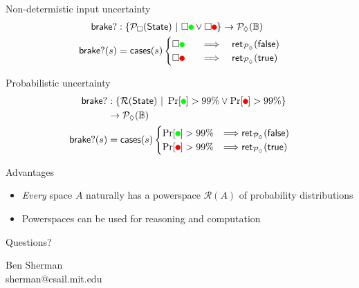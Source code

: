 \documentclass[14pt, notes]{beamer}
\newcommand{\PLower}{\mathcal{P}_\lozenge}
\newcommand{\PUpper}{\mathcal{P}_\square}
\newcommand{\Prob}{\mathcal{R}}
\newcommand{\State}{\mathsf{State}}
\newcommand{\suchthat}{\ |\ }
\newcommand{\bool}{\mathbb{B}}
\newcommand{\ret}[1]{\mathsf{ret}_{#1}}
\newcommand*{\tikzbullet}[2]{%
  \setbox0=\hbox{\strut}%
  \begin{tikzpicture}
    \useasboundingbox (-.25em,0) rectangle (.25em,\ht0);
    \filldraw[draw=#1,fill=#2] (0,0.3\ht0) circle[radius=.25em];
  \end{tikzpicture}%
}
\newcommand{\SafeToGo}{\tikzbullet{green}{green}}
\newcommand{\SafeToStop}{\tikzbullet{red}{red}}
\begin{document}
\begin{frame}{Non-determistic input uncertainty}
\begin{align*}
\mathsf{brake?} &: \{ \PUpper(\State) \suchthat \square \SafeToGo \vee \square \SafeToStop \} \to \PLower(\bool)
\\ \mathsf{brake?}(s) &= \mathsf{cases}(s)
\begin{cases}
\square \SafeToGo
  \quad &\Longrightarrow \quad
  \ret{\PLower}(\mathsf{false})
\\
\square \SafeToStop
  \quad &\Longrightarrow \quad
  \ret{\PLower}(\mathsf{true})
\end{cases}
\end{align*}
\end{frame}

\begin{frame}{Probabilistic uncertainty}
\begin{align*}
\mathsf{brake?} &: \{ \Prob(\State) \suchthat \Pr[\SafeToGo] > 99\% \vee \Pr[\SafeToStop] > 99\% \} 
\\ &\to \PLower(\bool)
\\ \mathsf{brake?}(s) &= \mathsf{cases}(s)
\begin{cases}
\Pr[\SafeToGo] > 99\%
   &\Longrightarrow
  \ret{\PLower}(\mathsf{false})
\\
\Pr[\SafeToStop] > 99\%
   &\Longrightarrow
  \ret{\PLower}(\mathsf{true})
\end{cases}
\end{align*}
\end{frame}

\begin{frame}{Advantages}
\begin{itemize}
\item \emph{Every} space $A$ naturally has a powerspace $\Prob(A)$ of probability distributions
\item Powerspaces can be used for reasoning and computation
\end{itemize}
\end{frame}

\begin{frame}
\begin{center}
\Huge Questions?

\vspace{3em}

\small Ben Sherman
\\ sherman@csail.mit.edu
\end{center}
\end{frame}
\end{document}
